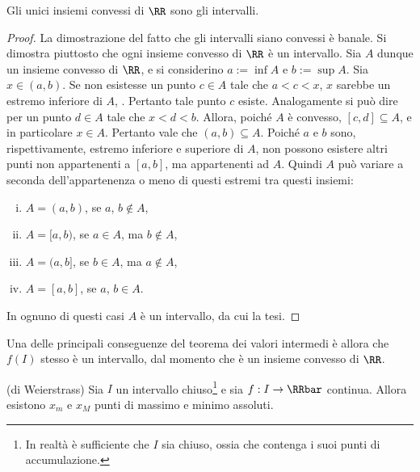 \documentclass[11pt]{article}
\begin{document}
	\begin{proposition}
		Gli unici insiemi convessi di $\RR$ sono gli intervalli.
	\end{proposition}

	\begin{proof}
		La dimostrazione del fatto che gli intervalli siano convessi è banale. Si dimostra piuttosto
		che ogni insieme convesso di $\RR$ è un intervallo. Sia $A$ dunque un insieme convesso di $\RR$,
		e si considerino $a := \inf A$ e $b := \sup A$. Sia $x \in (a, b)$. Se non esistesse un punto $c \in A$
		tale che $a < c < x$, $x$ sarebbe un estremo inferiore di $A$, \Lightning. Pertanto tale punto $c$ esiste.
		Analogamente si può dire per un punto $d \in A$ tale che $x < d < b$. Allora, poiché $A$ è convesso,
		$[c, d] \subseteq A$, e in particolare $x \in A$. Pertanto vale che $(a, b) \subseteq A$. Poiché
		$a$ e $b$ sono, rispettivamente, estremo inferiore e superiore di $A$, non possono esistere altri punti
		non appartenenti a $[a, b]$, ma appartenenti ad $A$. Quindi $A$ può variare a seconda dell'appartenenza
		o meno di questi estremi tra questi insiemi:
		
		\begin{enumerate}[(i)]
			\item $A = (a, b)$, se $a$, $b \notin A$,
			\item $A = [a, b)$, se $a \in A$, ma $b \notin A$,
			\item $A = (a, b]$, se $b \in A$, ma $a \notin A$,
			\item $A = [a, b]$, se $a$, $b \in A$.
		\end{enumerate}
	
		In ognuno di questi casi $A$ è un intervallo, da cui la tesi.
	\end{proof}

	\begin{remark}
		Una delle principali conseguenze del teorema dei valori intermedi è allora che $f(I)$ stesso è un intervallo,
		dal momento che è un insieme convesso di $\RR$.
	\end{remark}

	\begin{theorem} (di Weierstrass) Sia $I$ un intervallo chiuso\footnote{In realtà è sufficiente che $I$ sia chiuso, ossia che contenga i suoi punti
	di accumulazione.} e sia
		$f : I \to \RRbar$ continua. Allora esistono $x_m$ e $x_M$ punti
		di massimo e minimo assoluti.
	\end{theorem}
\end{document}
